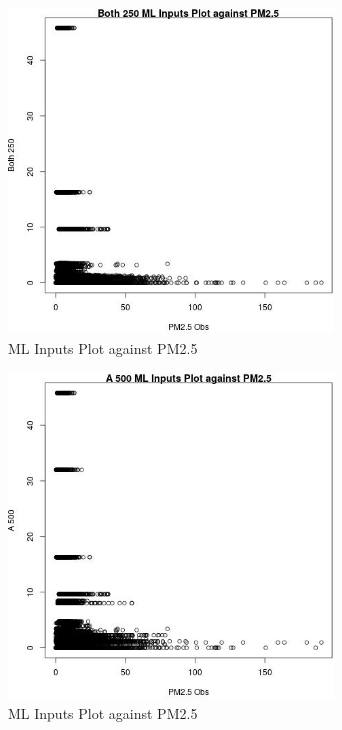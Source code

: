 \begin{figure} 
\centering  
\includegraphics[width=0.77\textwidth]{Code_Outputs/Report_ML_input_PM25_Step4_part_e_de_duplicated_aves_Both_250vPM25_Obs.jpg} 
\caption{\label{fig:Report_ML_input_PM25_Step4_part_e_de_duplicated_avesBoth_250vPM25_Obs}ML Inputs Plot against PM2.5} 
\end{figure} 
 

\clearpage 

\begin{figure} 
\centering  
\includegraphics[width=0.77\textwidth]{Code_Outputs/Report_ML_input_PM25_Step4_part_e_de_duplicated_aves_A_500vPM25_Obs.jpg} 
\caption{\label{fig:Report_ML_input_PM25_Step4_part_e_de_duplicated_avesA_500vPM25_Obs}ML Inputs Plot against PM2.5} 
\end{figure} 
 

